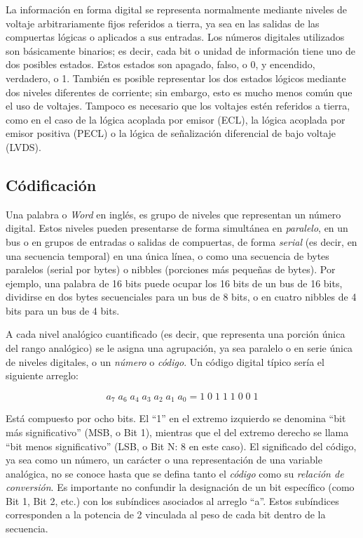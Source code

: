    La información en forma digital se representa normalmente mediante niveles de voltaje arbitrariamente fijos referidos a tierra, ya sea en las salidas de las compuertas lógicas o aplicados a sus entradas. Los números digitales utilizados son básicamente binarios; es decir, cada bit o unidad de información tiene uno de dos posibles estados. Estos estados son apagado, falso, o 0, y encendido, verdadero, o 1. También es posible representar los dos estados lógicos mediante dos niveles diferentes de corriente; sin embargo, esto es mucho menos común que el uso de voltajes. Tampoco es necesario que los voltajes estén referidos a tierra, como en el caso de la lógica acoplada por emisor (ECL), la lógica acoplada por emisor positiva (PECL) o la lógica de señalización diferencial de bajo voltaje (LVDS).

    \subsection{Códificación}

    Una palabra o \textit{Word} en inglés, es grupo de niveles que representan un número digital. Estos niveles pueden presentarse de forma simultánea en \textit{paralelo}, en un bus o en grupos de entradas o salidas de compuertas, de forma \textit{serial} (es decir, en una secuencia temporal) en una única línea, o como una secuencia de bytes paralelos (serial por bytes) o nibbles (porciones más pequeñas de bytes). Por ejemplo, una palabra de 16 bits puede ocupar los 16 bits de un bus de 16 bits, dividirse en dos bytes secuenciales para un bus de 8 bits, o en cuatro nibbles de 4 bits para un bus de 4 bits.

    A cada nivel analógico cuantificado (es decir, que representa una porción única del rango analógico) se le asigna una agrupación, ya sea paralelo o en serie única de niveles digitales, o un \textit{número} o \textit{código}. Un código digital típico sería el siguiente arreglo:

    \begin{equation}
      a_{7} \; a_{6} \; a_{4} \; a_{3} \; a_{2} \; a_{1} \; a_{0} = 1 \; 0 \; 1 \; 1 \; 1 \; 0 \; 0 \; 1
    \end{equation}

    Está compuesto por ocho bits. El ``1'' en el extremo izquierdo se denomina ``bit más significativo'' (MSB, o Bit 1), mientras que el del extremo derecho se llama ``bit menos significativo'' (LSB, o Bit N: 8 en este caso). El significado del código, ya sea como un número, un carácter o una representación de una variable analógica, no se conoce hasta que se defina tanto el \textit{código} como su \textit{relación de conversión}. Es importante no confundir la designación de un bit específico (como Bit 1, Bit 2, etc.) con los subíndices asociados al arreglo ``a''. Estos subíndices corresponden a la potencia de 2 vinculada al peso de cada bit dentro de la secuencia.

